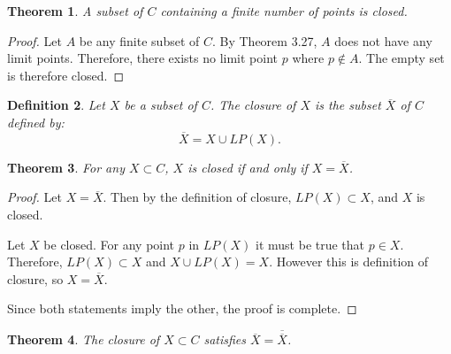 \documentclass{amsart}
\newtheorem{theorem}{Theorem}
\newtheorem{definition}[theorem]{Definition}
\newcommand{\1}{\mathds{1}}
\numberwithin{equation}{section}
\numberwithin{theorem}{section}
\begin{document}
\begin{theorem}  A subset of $C$ containing a finite number of points is closed.
\end{theorem}

\begin{proof}
	Let $A$ be any finite subset of $C$. By Theorem 3.27, $A$ does not have any limit points. Therefore, there exists no limit point $p$ where $p\notin A$. The empty set is therefore closed.
\end{proof}

\begin{definition}
Let $X$ be a subset of $C$.  The \emph{closure} of $X$ is the subset $\overline{X}$ of $C$ defined by:
\[
\overline{X} = X \cup LP(X).
\]
\end{definition}

\begin{theorem}  For any $X\subset C$, $X$ is closed if and only if $X = \overline{X}$.
\end{theorem}

\begin{proof}
	Let $X = \overline{X}$. Then by the definition of closure, $LP(X)\subset X$, and $X$ is closed.
	
	Let $X$ be closed. For any point $p$ in $LP(X)$ it must be true that $p\in X$. Therefore, $LP(X)\subset X$ and $X\cup LP(X) = X$. However this is definition of closure, so $X = \overline{X}$.
	
	Since both statements imply the other, the proof is complete.
\end{proof}

\begin{theorem}  The closure of $X \subset C$ satisfies $\overline{X} = \overline{\overline{X}}$.
\end{theorem}
\end{document}
